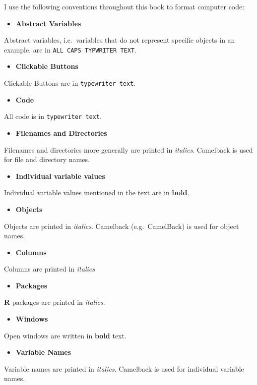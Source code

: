 I use the following conventions throughout this book to format computer
code:

\begin{itemize}
\item
  \textbf{Abstract Variables}
\end{itemize}
Abstract variables, i.e.~variables that do not represent specific
objects in an example, are in \texttt{ALL CAPS TYPWRITER TEXT}.

\begin{itemize}
\item
  \textbf{Clickable Buttons}
\end{itemize}
Clickable Buttons are in \texttt{typewriter text}.

\begin{itemize}
\item
  \textbf{Code}
\end{itemize}
All code is in \texttt{typewriter text}.

\begin{itemize}
\item
  \textbf{Filenames and Directories}
\end{itemize}
Filenames and directories more generally are printed in \emph{italics}.
Camelback is used for file and directory names.

\begin{itemize}
\item
  \textbf{Individual variable values}
\end{itemize}
Individual variable values mentioned in the text are in \textbf{bold}.

\begin{itemize}
\item
  \textbf{Objects}
\end{itemize}
Objects are printed in \emph{italics}. Camelback (e.g.~CamelBack) is
used for object names.

\begin{itemize}
\item
  \textbf{Columns}
\end{itemize}
Columns are printed in \emph{italics}

\begin{itemize}
\item
  \textbf{Packages}
\end{itemize}
\textbf{R} packages are printed in \emph{italics}.

\begin{itemize}
\item
  \textbf{Windows}
\end{itemize}
Open windows are written in \textbf{bold} text.

\begin{itemize}
\item
  \textbf{Variable Names}
\end{itemize}
Variable names are printed in \emph{italics}. Camelback is used for
individual variable names.

